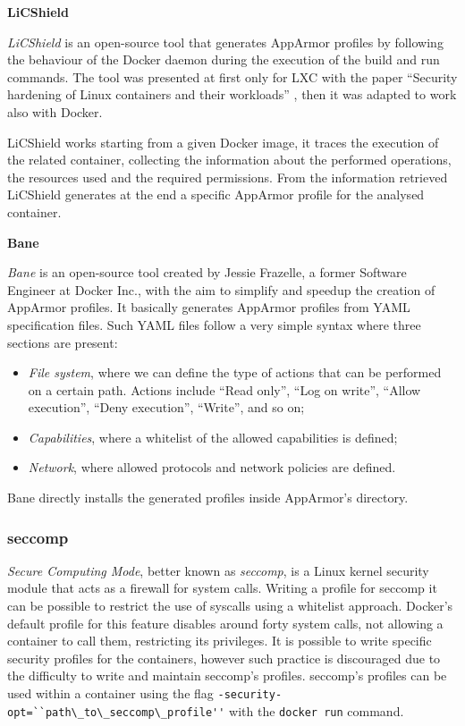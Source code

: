 \documentclass[a4paper,12pt]{article}
\newcommand{\code}[1]{\lstinline|#1|}
\begin{document}
\bigbreak\textbf{LiCShield}\bigbreak 

\textit{LiCShield} \cite{licshield} is an open-source tool that generates
AppArmor profiles by following the behaviour of the Docker daemon during the
execution of the build and run commands. The tool was presented at first only
for LXC with the paper ``Security hardening of Linux containers and their
workloads'' \cite{licshield_paper}, then it was adapted to work also with
Docker. \par LiCShield works starting from a given Docker image, it traces the
execution of the related container, collecting the information about the
performed operations, the resources used and the required permissions. From the
information retrieved LiCShield generates at the end a specific AppArmor profile
for the analysed container. 

\bigbreak\textbf{Bane}\bigbreak 

\textit{Bane} \cite{bane_jesse_frazelle} is an open-source tool created by
Jessie Frazelle, a former Software Engineer at Docker Inc., with the aim to
simplify and speedup the creation of AppArmor profiles. It basically generates
AppArmor profiles from YAML specification files. Such YAML files follow a very
simple syntax where three sections are present:
\begin{itemize}
  \item \textit{File system}, where we can define the type of actions that can be
  performed on a certain path. Actions include ``Read only'', ``Log on write'',
  ``Allow execution'', ``Deny execution'', ``Write'', and so on;
  \item \textit{Capabilities}, where a whitelist of the allowed capabilities is
  defined;
  \item \textit{Network}, where allowed protocols and network policies are
  defined.
\end{itemize}
Bane directly installs the generated profiles inside AppArmor's directory.  

\subsubsection{seccomp}

\textit{Secure Computing Mode}, better known as \textit{seccomp}, is a Linux kernel security
module that acts as a firewall for system calls. Writing a profile for seccomp
it can be possible to restrict the use of syscalls using a whitelist approach.
Docker's default profile for this feature disables around forty system calls,
not allowing a container to call them, restricting its privileges. It is
possible to write specific security profiles for the containers, however such
practice is discouraged due to the difficulty to write and maintain seccomp's
profiles. seccomp's profiles can be used within a container using the flag
\code{-security-opt=``path\_to\_seccomp\_profile''} with the \code{docker run} command.
\end{document}
